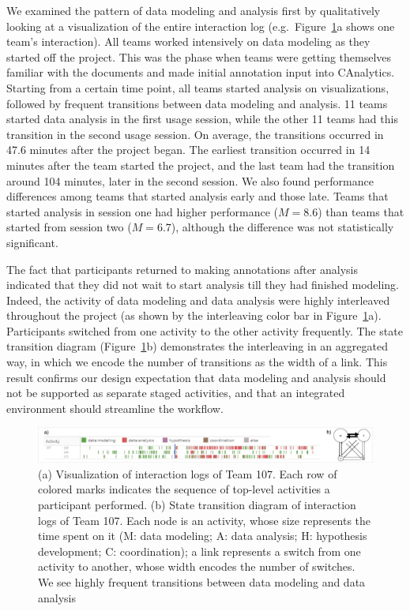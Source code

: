 We examined the pattern of data modeling and analysis first by
qualitatively looking at a visualization of the entire interaction log
(e.g.~Figure~\ref{fig:interleaving}a shows one team's interaction). All teams
worked intensively on data modeling as they started off the project.
This was the phase when teams were getting themselves familiar with the
documents and made initial annotation input into CAnalytics. Starting from a certain
time point, all teams started analysis on visualizations,
followed by frequent transitions between data modeling and analysis. 11
teams started data analysis in the first usage session, while the other
11 teams had this transition in the second usage session. On average,
the transitions occurred in 47.6 minutes after the project began. The earliest transition occurred in 14 minutes after the team started the project, and the last team
had the transition around 104 minutes, later in the second session. We
also found performance differences among teams that started analysis
early and those late. Teams that started analysis in session one had
higher performance ($M=8.6$) than teams that started from session two
($M=6.7$), although the difference was not statistically significant.

The fact that participants returned to making annotations after analysis
indicated that they did not wait to start analysis till they had
finished modeling. Indeed, the activity of data modeling and data
analysis were highly interleaved throughout the project (as shown by the interleaving color bar in Figure~\ref{fig:interleaving}a). Participants switched from
one activity to the other activity frequently. The state transition
diagram (Figure~\ref{fig:interleaving}b) demonstrates the interleaving in an aggregated way, in which we
encode the number of transitions as the width of a link. This result
confirms our design expectation that data modeling and analysis should
not be supported as separate staged activities, and that an integrated
environment should streamline the workflow.

\begin{figure}
\centering
\includegraphics[width=\columnwidth]{./04-Study_one/img/intertwined.jpg}
\caption{(a) Visualization of interaction logs of Team 107. Each row of
colored marks indicates the sequence of top-level activities a
participant performed. (b) State transition diagram of interaction logs of Team 107. Each node is an activity, whose size represents the time spent on it (M: data modeling; A: data analysis; H: hypothesis development; C: coordination); a
link represents a switch from one activity to another, whose width
encodes the number of switches. We see highly frequent transitions between data modeling and data analysis \label{fig:interleaving}}
\end{figure}





